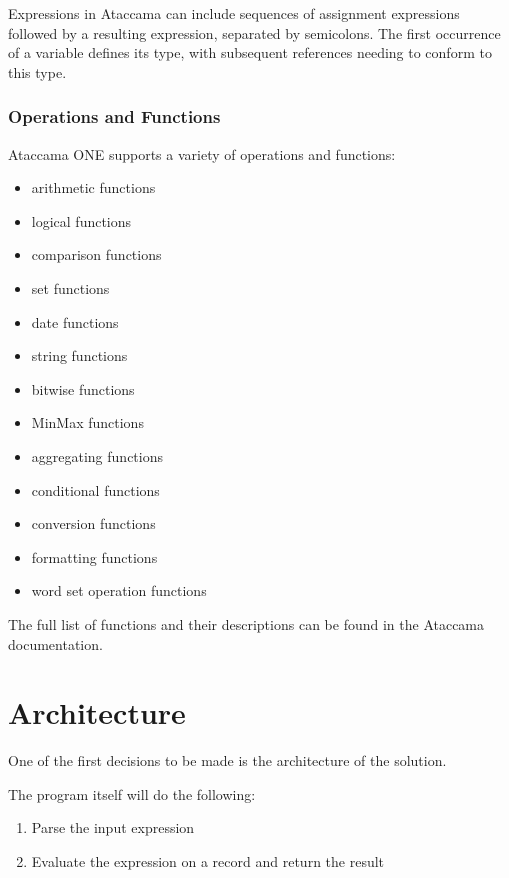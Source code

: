     Expressions in Ataccama can include sequences of assignment expressions followed by a resulting expression, separated by semicolons. The first occurrence of a variable defines its type, with subsequent references needing to conform to this type.

    \subsubsection{Operations and Functions}
    
    Ataccama ONE supports a variety of operations and functions:

    \begin{itemize}
        \item arithmetic functions
        \item logical functions
        \item comparison functions
        \item set functions
        \item date functions
        \item string functions
        \item bitwise functions
        \item MinMax functions
        \item aggregating functions
        \item conditional functions
        \item conversion functions
        \item formatting functions
        \item word set operation functions
    \end{itemize}

    The full list of functions and their descriptions can be found in the Ataccama documentation.


\section{Architecture}

One of the first decisions to be made is the architecture of the solution.

The program itself will do the following:

\begin{enumerate}
    \item Parse the input expression
    \item Evaluate the expression on a record and return the result
\end{enumerate}

